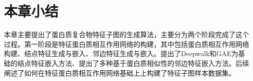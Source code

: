 \section{本章小结}
\label{section:FeatSubNetworkConstruct:summary}

本章主要提出了蛋白质复合物特征子图的生成算法，主要分为两个阶段完成了这个过程。第一阶段是特征蛋白质相互作用网络的构建，其中包括蛋白质相互作用网络构建、结点特征生成与嵌入、邻边特征生成与嵌入。提出了Deepwalk和GAE为基础的结点特征嵌入方法、提出了多种基于蛋白质相似性的邻边特征嵌入方法。后续阐述了如何在特征蛋白质相互作用网络基础上上构建了特征子图样本数据集。
